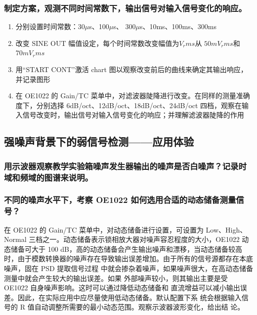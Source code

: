 \documentclass[11pt,a4paper]{ctexart}
\begin{document}
		\subsubsection{制定方案，观测不同时间常数下，输出信号对输入信号变化的响应。}
		\begin{enumerate}
			\item 分别设置时间常数：30$\mu$s、100$\mu$s、
			300$\mu$s、10ms、100ms、300ms
			\item 改变 SINE OUT 幅值设定，每个时间常数改变幅值为$V_rms$从 $50mV_rms$和$70mV_rms$
			\item 用“START CONT”激活 chart 图以观察改变前后的曲线来确定其输出响应，并记录图形
		
		\item 在 OE1022 的 Gain/TC 菜单中，对滤波器陡降进行改变。在同样的测量准确度下，分别选择 6dB/oct、12dB/oct、18dB/oct、24dB/oct 四档，观察在输入信号改变时，输出信号对输入信号变化的响应；并理解滤波器陡降的作用
	\end{enumerate}
	\subsection{强噪声背景下的弱信号检测——应用体验}
	\subsubsection{用示波器观察教学实验箱噪声发生器输出的噪声是否白噪声？记录时域和频域的图谱来说明。}
	\subsubsection{不同的噪声水平下，考察 OE1022 如何选用合适的动态储备测量信号？}
	在 OE1022 的 Gain/TC 菜单中，对动态储备进行设置，可设置为 Low、High、Normal
	三档之一。动态储备表示锁相放大器对噪声容忍程度的大小，OE1022 动态储备可大于
	100 dB，高的动态储备会产生输出噪声和漂移，当动态储备较高时，由于模数转换器的噪声存在导致输出误差增加。由于所有的信号源都存在本底噪声，固在 PSD 提取信号过程
	中就会掺杂着噪声，如果噪声很大，在高动态储备测量中就会产生较大的输出误差。如果
	外部噪声较小，则其输出主要是受 OE1022 自身噪声影响。这时可以通过降低动态储备和
	直流增益可以减小输出误差。因此，在实际应用中应尽量使用低动态储备。默认配置下系
	统会根据输入信号的 R 值自动调整所需要的最小动态范围。观察示波器波形变化，给出结
	论。
\end{document}
